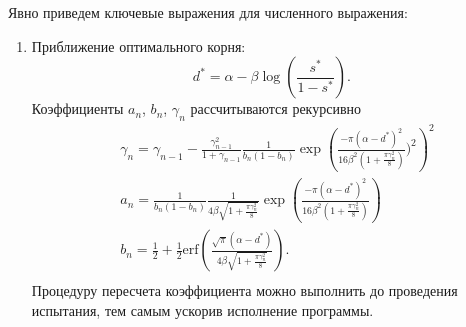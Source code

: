 Явно приведем ключевые выражения для численного выражения:
\begin{enumerate}
    \item Приближение оптимального корня:
    \begin{equation}
        d^* = \alpha  - \beta \log\left(\frac{s^*}{1-s^*}\right).
    \end{equation} Коэффициенты $a_n$, $b_n$, $\gamma_n$ рассчитываются рекурсивно
    \begin{equation}
        \begin{aligned}
            &\gamma_n = \gamma_{n-1} - \frac{\gamma_{n-1}^2}{1+\gamma_{n-1}} \frac{1}{b_n(1-b_n)}
        \exp\left(\frac{- \pi (\alpha-d^*)^2}{16  \beta^2 ( 1+\frac{\pi\gamma_n^2}{8})})^2\right)^2 \\
            &a_n = \frac{1}{b_n(1-b_n)} \frac{1}{4  \beta \sqrt{1+\frac{\pi\gamma_n^2}{8}}} \exp\left( \frac{- \pi (\alpha-d^*)^2}{16  \beta^2 ( 1+\frac{\pi\gamma_n^2}{8})}\right)  \\
            &b_n = \frac{1}{2} + \frac{1}{2} \text{erf}\left(\frac{\sqrt{\pi} (\alpha-d^*)}{4 \beta \sqrt{1+\frac{\pi\gamma_n^2}{8}}} \right).\\  
        \end{aligned}
    \end{equation}
    Процедуру пересчета коэффициента можно выполнить до проведения испытания, тем самым ускорив исполнение программы.
\end{enumerate}


